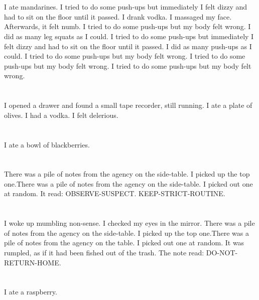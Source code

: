 \documentclass{article}
\begin{document}
    \section{}
    I ate mandarines. I tried to do some push-ups but immediately I felt dizzy and had to sit on the floor until it passed. I drank vodka.  I massaged my face. Afterwards, it felt numb.  I tried to do some push-ups but my body felt wrong.  I did as many leg squats as I could.  I tried to do some push-ups but immediately I felt dizzy and had to sit on the floor until it passed.   I did as many push-ups as I could.  I tried to do some push-ups but my body felt wrong.  I tried to do some push-ups but my body felt wrong.  I tried to do some push-ups but my body felt wrong.  
    \newpage
    
    \section{}
    I opened a drawer and found a small tape recorder, still running. I ate a plate of olives. I had a vodka. I felt delerious.  
    \newpage
    
    \section{}
    I ate a bowl of blackberries.  
    \newpage
    
    \section{}
    There was a pile of notes from the agency on the side-table. I picked up the top one.There was a pile of notes from the agency on the side-table. I picked out one at random. It read: OBSERVE-SUSPECT. KEEP-STRICT-ROUTINE.  
    \newpage
    
    \section{}
    I woke up mumbling non-sense. I checked my eyes in the mirror. There was a pile of notes from the agency on the side-table. I picked up the top one.There was a pile of notes from the agency on the table. I picked out one at random. It was rumpled, as if it had been fished out of the trash. The note read: DO-NOT-RETURN-HOME.  
    \newpage
    
    \section{}
    I ate a raspberry.  
    \newpage
    
\end{document}
